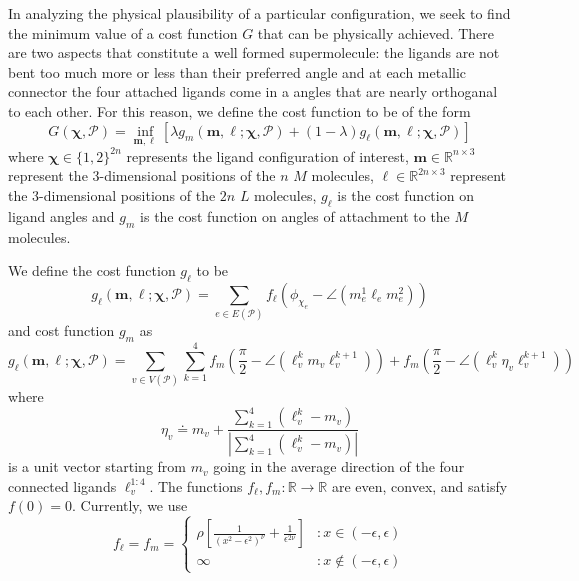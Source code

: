 \documentclass[12pt]{article}
\begin{document}
In analyzing the physical plausibility of a particular configuration, we seek to find the minimum value of a cost function $G$ that can be physically achieved. There are two aspects that constitute a well formed supermolecule: the ligands are not bent too much more or less than their preferred angle and at each metallic connector the four attached ligands come in a angles that are nearly orthoganal to each other. For this reason, we define the cost function to be of the form
$$G\left(\mathbf{\chi},\mathcal{P}\right) = \inf_{\mathbf{m},\boldsymbol\ell}\left[\lambda g_m\left(\mathbf{m},\boldsymbol\ell;\mathbf{\chi},\mathcal{P}\right) + \left(1-\lambda\right) g_\ell\left(\mathbf{m},\boldsymbol\ell;\mathbf{\chi},\mathcal{P}\right) \right]$$ 
where $\mathbf{\chi} \in \{1,2\}^{2n}$ represents the ligand configuration of interest, $\mathbf{m} \in \mathbb{R}^{n\times 3}$ represent the 3-dimensional positions of the $n$ $M$ molecules, $\boldsymbol\ell \in \mathbb{R}^{2n\times 3}$ represent the 3-dimensional positions of the $2n$ $L$ molecules, $g_\ell$ is the cost function on ligand angles and  $g_m$ is the cost function on angles of attachment to the $M$ molecules. 

We define the cost function $g_\ell$  to be 
$$g_\ell\left(\mathbf{m},\boldsymbol\ell;\mathbf{\chi},\mathcal{P}\right) = \sum_{e \in E(\mathcal{P})}f_\ell\left(\phi_{\chi_e} - \angle\left(m_e^1\ell_em_e^2\right)\right)$$
and cost function $g_m$ as  
$$g_\ell\left(\mathbf{m},\boldsymbol\ell;\mathbf{\chi},\mathcal{P}\right) = \sum_{v \in V(\mathcal{P})}\sum_{k=1}^4f_m\left(\frac{\pi}{2} - \angle\left(\ell_v^km_v\ell_v^{k+1}\right)\right)+f_m\left(\frac{\pi}{2} - \angle\left(\ell_v^k\eta_v\ell_v^{k+1}\right)\right)$$
where 
$$\eta_v \doteq m_v + \frac{\sum_{k=1}^4\left(\ell_v^k-m_v\right)}{\left|\sum_{k=1}^4\left(\ell_v^k-m_v\right)\right|}$$
is a unit vector starting from $m_v$ going in the average direction of the four connected ligands $\ell^{1:4}_v$. The functions $f_\ell ,f_m :\mathbb{R} \to \mathbb{R}$ are even, convex, and satisfy $f(0) = 0$. Currently, we use 
\begin{displaymath}
   f_\ell = f_m = \left\{
     \begin{array}{lr}
       \rho\left[\frac{1}{\left(x^2-\epsilon^2\right)^\nu} + \frac{1}{\epsilon^{2\nu}}\right] & : x \in \left(-\epsilon,\epsilon\right)\\
       \infty & : x \not\in \left(-\epsilon,\epsilon\right)
     \end{array}
   \right.
\end{displaymath} 
\end{document}
